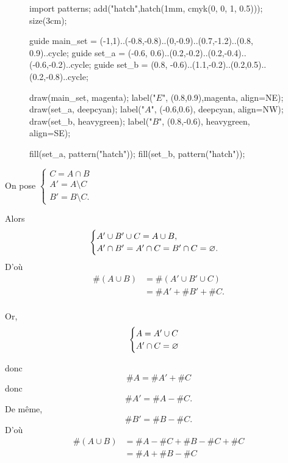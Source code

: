 \begin{prv}
	\begin{minipage}{\linewidth}
		\begin{wrapfigure}{r}{3cm}
			\centering
			\vspace{-7mm}
			\begin{asy}
				import patterns;
				add("hatch",hatch(1mm, cmyk(0, 0, 1, 0.5)));
				size(3cm);

				guide main_set = (-1,1)..(-0.8,-0.8)..(0,-0.9)..(0.7,-1.2)..(0.8, 0.9)..cycle;
				guide set_a = (-0.6, 0.6)..(0.2,-0.2)..(0.2,-0.4)..(-0.6,-0.2)..cycle;
				guide set_b = (0.8, -0.6)..(1.1,-0.2)..(0.2,0.5)..(0.2,-0.8)..cycle;

				draw(main_set, magenta); label("$E$", (0.8,0.9),magenta, align=NE);
				draw(set_a, deepcyan); label("$A$", (-0.6,0.6), deepcyan, align=NW);
				draw(set_b, heavygreen); label("$B$", (0.8,-0.6), heavygreen, align=SE);

				fill(set_a, pattern("hatch"));
				fill(set_b, pattern("hatch"));
			\end{asy}
		\end{wrapfigure}
		On pose $\begin{cases}
			C = A\cap B\\
			A' = A \setminus C\\
			B' = B \setminus C.
		\end{cases}$

		Alors \[
			\begin{cases}
				A' \cup B' \cup C = A\cup B,\\
				A' \cap B' = A' \cap C = B'\cap C = \varnothing.
			\end{cases}
		\]
		D'où
		\begin{align*}
			\#(A\cup B) &= \#(A'\cup B'\cup C)\\
			&= \#A' + \#B' + \#C. \\
		\end{align*}

		Or, \[
			\begin{cases}
				A = A' \cup C\\
				A' \cap C = \varnothing
			\end{cases}
		\]
	\end{minipage}

	donc \[
		\#A = \#A' + \#C
	\] donc \[
		\#A' = \#A - \#C.
	\] De même, \[
		\#B' = \#B - \#C.
	\]
	D'où
	\begin{align*}
		\#(A\cup B) &= \#A - \#C + \#B - \#C + \#C \\
		&= \#A + \#B - \#C \\
	\end{align*}
\end{prv}

